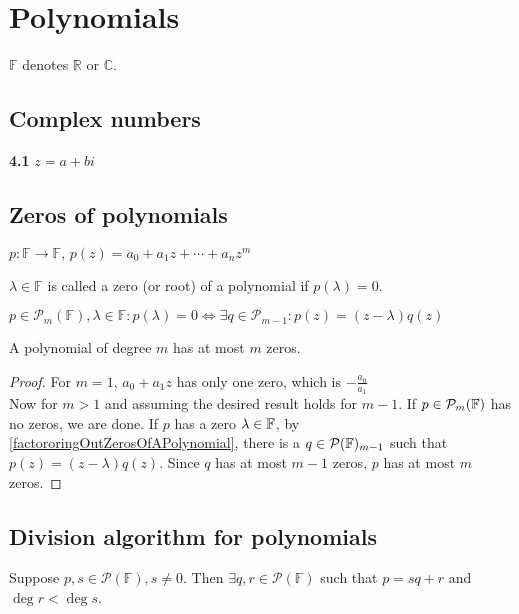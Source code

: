 \chapter{Polynomials}
$\mathbb{F}$ denotes $\mathbb{R}$ or $\mathbb{C}$.
\section{Complex numbers}

\setcounter{thm}{0}
\textbf{4.1} $z = a+bi$

\section{Zeros of polynomials}
$p: \mathbb{F} \to \mathbb{F}, \, p(z) = a_0 + a_1z + \cdots + a_n z^m$

\setcounter{thm}{4}
\begin{thm}
    $\lambda \in \mathbb{F}$ is called a zero (or root) of a polynomial if $p(\lambda) = 0$.
\end{thm}

\setcounter{thm}{5}
\begin{thm}
    \label{factororingOutZerosOfAPolynomial}
    $p \in \mathcal{P}_m(\mathbb{F}), \lambda \in \mathbb{F}: p(\lambda) = 0 \iff \exists q \in \mathcal{P}_{m-1}: p(z) = (z-\lambda)q(z)$
\end{thm}

\setcounter{thm}{7}
\begin{thm}
    A polynomial of degree $m$ has at most $m$ zeros.
\end{thm}
\begin{proof}
    For $m=1$, $a_0+a_1z$ has only one zero, which is $-\frac{a_0}{a_1}$\\
    Now for $m>1$ and assuming the desired result holds for $m-1$. If $p\in \mathcal{P}_{m}(\mathbb{F})$ has no zeros, we are done. If $p$ has a zero $\lambda \in \mathbb{F}$, by \ref{factororingOutZerosOfAPolynomial}, there is a $q \in \mathcal{P}(\mathbb{F})_{m-1}$ such that $p(z)=(z-\lambda)q(z).$ Since $q$ has at most $m-1$ zeros, $p$ has at most $m$ zeros.
\end{proof}

\section{Division algorithm for polynomials}

\setcounter{thm}{8}
\begin{thm}
    \label{division-algorithm-for-polynomials}
    Suppose $p,s \in \mathcal{P} (\mathbb{F}), s\neq 0$. Then $\exists q,r \in \mathcal{P} (\mathbb{F})$ such that
$p=sq+r$ and $\deg r < \deg s$.
\end{thm}


